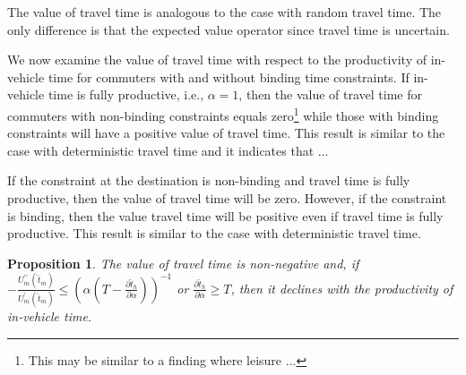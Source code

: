 \documentclass[12pt,a4paper,british]{article}
\newtheorem{prop}{Proposition}[section]
\begin{document}
The value of travel time is analogous to the case with random travel time. The only difference is that the expected  value operator since travel time is uncertain. 

We now examine the value of travel time with respect to the productivity of in-vehicle time for commuters with and without binding time constraints. If in-vehicle time is fully productive, i.e., $\alpha=1$,  then the value of travel time for commuters with non-binding constraints equals zero\footnote{This may be similar to a finding where leisure ... } while those with binding constraints will have a positive value of travel time. This result is similar to the case with deterministic travel time and it indicates that ... 

If the constraint at the destination is non-binding and travel time is fully productive, then the value of travel time will be zero. However, if the constraint is binding, then the value travel time will be positive even if travel time is fully productive. This result is similar to the case with deterministic travel time.

\begin{prop}
The value of travel time is non-negative and, if $-\frac{U_{m} ^{\prime\prime} \left( \hat{t}_{m} \right)} {U_{m}^{\prime} \left(\hat{t}_{m}\right)} \leq \left(\alpha \left(T-\frac{\partial \hat{t}_h}{\partial \alpha} \right) \right)^{-1}$ or $\frac{\partial \hat{t}_h}{\partial \alpha} \geq T$, then it declines with the productivity of in-vehicle time. %
\end{prop}
\end{document}

